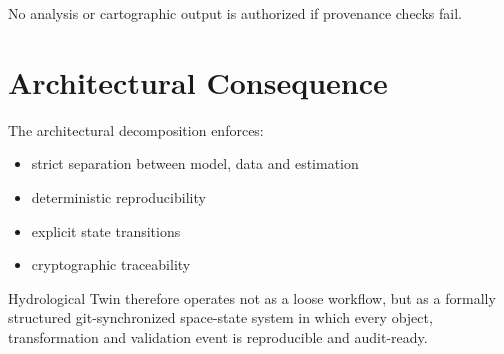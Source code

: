 No analysis or cartographic output is authorized if provenance checks fail.


\section{Architectural Consequence}

The architectural decomposition enforces:

\begin{itemize}
\item strict separation between model, data and estimation
\item deterministic reproducibility
\item explicit state transitions
\item cryptographic traceability
\end{itemize}

Hydrological Twin therefore operates not as a loose workflow, but as a formally structured git-synchronized space-state system in which every object, transformation and validation event is reproducible and audit-ready.
